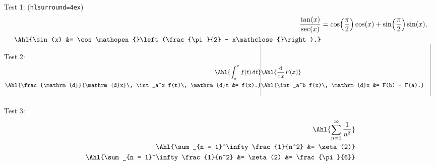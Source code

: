 \documentclass{article}
\def\argopen{\mathopen{}\left}
\def\argclose{\mathclose{}\right}
\begin{document}
Test 1: (\verb+hlsurround=4ex+)
\begingroup {}
\begin{align*}
  \frac{\tan(x)}{\sec(x)}
    &= \cos\argopen(\frac{\pi}{2}\argclose)
    \cos(x) + \sin\argopen(\frac{\pi}{2}\argclose) \sin(x), \\
  \Ahl{\sin(x) &= \cos\argopen(\frac{\pi}{2} - x\argclose).}
\end{align*} \endgroup

Test 2:
\def\bigstick{\smash{\vrule width 0.2pt height 1.2in depth 0pt}}
\begin{align*}
  \Ahl{\int_a^x f(t)\, \mathrm{d}t}
    & \Ahl{\frac{\mathrm{d}}{\mathrm{d}x} F(x)} \\
  \Ahl{\frac{\mathrm{d}}{\mathrm{d}x}\, \int_a^x f(t)\, \mathrm{d}t &= f(x).}
    & \Ahl{\int_a^b f(x)\, \mathrm{d}x &= F(b) - F(a).} \\
  \bigstick & \bigstick & \bigstick & \bigstick \\
\end{align*}

Test 3:
\begin{align*}
  \Ahl{\sum_{n = 1}^\infty \frac{1}{n^2}} \\
  \Ahl{\sum_{n = 1}^\infty \frac{1}{n^2} &= \zeta(2)} \\
  \Ahl{\sum_{n = 1}^\infty \frac{1}{n^2} &= \zeta(2) &= \frac{\pi}{6}}
\end{align*}
\end{document}
